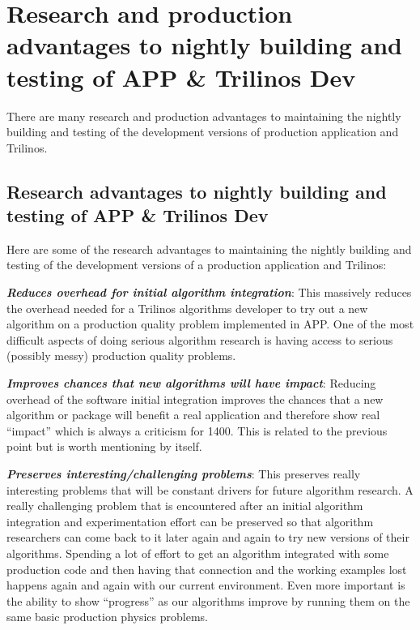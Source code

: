 \documentclass[pdf,ps2pdf,11pt]{SANDreport}
\begin{document}
%
{}\section{Research and production advantages to nightly building and testing
of APP \& Trilinos Dev}
%

There are many research and production advantages to maintaining the nightly
building and testing of the development versions of production application and
Trilinos.


%
{}\subsection{Research advantages to nightly building and testing of APP \&
Trilinos Dev}
%

Here are some of the research advantages to maintaining the nightly building
and testing of the development versions of a production application and
Trilinos:

{}\textit{\textbf{Reduces overhead for initial algorithm integration}}: This
massively reduces the overhead needed for a Trilinos algorithms developer to
try out a new algorithm on a production quality problem implemented in APP.
One of the most difficult aspects of doing serious algorithm research is
having access to serious (possibly messy) production quality problems.

{}\textit{\textbf{Improves chances that new algorithms will have impact}}:
Reducing overhead of the software initial integration improves the chances
that a new algorithm or package will benefit a real application and therefore
show real ``impact'' which is always a criticism for 1400.  This is related to
the previous point but is worth mentioning by itself.

{}\textit{\textbf{Preserves interesting/challenging problems}}: This preserves
really interesting problems that will be constant drivers for future algorithm
research.  A really challenging problem that is encountered after an initial
algorithm integration and experimentation effort can be preserved so that
algorithm researchers can come back to it later again and again to try new
versions of their algorithms.  Spending a lot of effort to get an algorithm
integrated with some production code and then having that connection and the
working examples lost happens again and again with our current environment.
Even more important is the ability to show ``progress'' as our algorithms
improve by running them on the same basic production physics problems.
\end{document}
